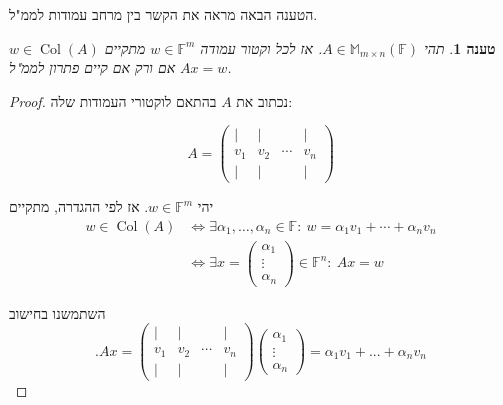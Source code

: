 \documentclass[12pt]{report}
\theoremstyle{plain}
\newtheorem{proposition}[theorem]{טענה}
\theoremstyle{definition}
\newcommand{\F}{\mathbb{F}}
\newcommand{\M}{\mathbb{M}}
\newcommand{\0}{\mathbf{0}}
\DeclareMathOperator{\Col}{Col}
\begin{document}
הטענה הבאה מראה את הקשר בין מרחב עמודות לממ"ל.

\begin{proposition}\label{prop:column-space}
תהי
$A\in\M_{m\times n}(\F)$.
אז לכל וקטור עמודה 
$w\in\F^m$
מתקיים
$w\in\Col(A)$
אם ורק אם קיים פתרון לממ"ל
$Ax=w$.
\end{proposition}

\begin{proof}
נכתוב את
$A$
בהתאם לוקטורי העמודות שלה:

$$
A=\begin{pmatrix}
| & | & & | \\
v_1 & v_2 & \cdots & v_n \\
| & | & & |
\end{pmatrix}
$$

יהי 
$w\in\F^m$.
אז לפי ההגדרה, מתקיים
$$
\begin{aligned}
w\in\Col(A)
&\iff
\exists \alpha_1,\ldots,\alpha_n\in\F:\
w=\alpha_1v_1+\cdots+\alpha_nv_n
\\[6pt]
&\iff\exists x=
\begin{pmatrix}
\alpha_1\\
\vdots\\
\alpha_n
\end{pmatrix}
\in\F^n :\
Ax=w
\end{aligned}
$$

השתמשנו בחישוב
$$
.Ax=\begin{pmatrix}
| & | & & | \\
v_1 & v_2 & \cdots & v_n \\
| & | & & |
\end{pmatrix}\begin{pmatrix}
\alpha_1\\
\vdots\\
\alpha_n
\end{pmatrix}=\alpha_1v_1+...+\alpha_nv_n
$$

\end{proof}
\end{document}
